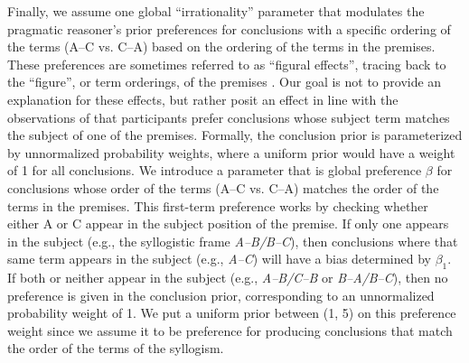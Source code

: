 \documentclass[floatsintext, doc]{apa6}
\begin{document}
Finally, we assume one global ``irrationality'' parameter that modulates the pragmatic reasoner's prior preferences for conclusions with a specific ordering of the terms (A--C vs. C--A) based on the ordering of the terms in the premises. 
These preferences are sometimes referred to as ``figural effects'', tracing back to the ``figure'', or term orderings, of the premises \cite{Wetherick1990, rips1994}.
Our goal is not to provide an explanation for these effects, but rather posit an effect in line with the observations of  that participants prefer conclusions whose subject term matches the subject of one of the premises.
Formally, the conclusion prior is parameterized by unnormalized probability weights, where a uniform prior would have a weight of 1 for all conclusions. 
We introduce a parameter that is global preference  $\beta$ for conclusions whose order of the terms (A--C vs. C--A) matches the order of the terms in the premises.
This first-term preference works by checking whether either A or C appear in the subject position of the premise.
If only one appears in the subject (e.g., the syllogistic frame \emph{A--B/B--C}), then conclusions where that same term appears in the subject (e.g., \emph{A--C}) will have a bias determined by $\beta_1$.
If both or neither appear in the subject (e.g., \emph{A--B/C--B} or \emph{B--A/B--C}), then no preference is given in the conclusion prior, corresponding to an unnormalized probability weight of 1. 
We put a uniform prior between (1, 5) on this preference weight since we assume it to be preference for producing conclusions that match the order of the terms of the syllogism. 





\end{document}

